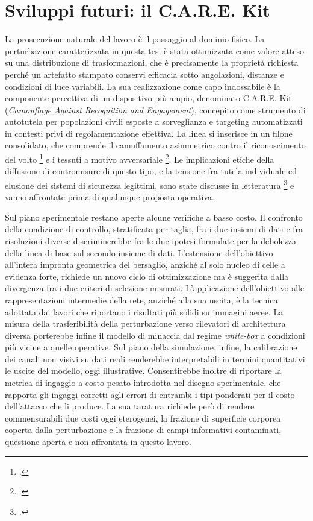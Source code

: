 \ifstampa\documentclass[a4paper,12pt,twoside,openright]{report}\else\documentclass[a4paper,12pt]{report}\fi
\newif\ifrevisione \revisionefalse
\DeclareRobustCommand{\rev}[1]{\ifrevisione{\color{blue!65!black}#1}\else#1\fi}
\begin{document}
\section{Sviluppi futuri: il C.A.R.E. Kit}

La prosecuzione naturale del lavoro è il passaggio al dominio fisico. La perturbazione caratterizzata in questa tesi è stata ottimizzata come valore atteso su una distribuzione di trasformazioni, che è precisamente la proprietà richiesta perché un artefatto stampato conservi efficacia sotto angolazioni, distanze e condizioni di luce variabili. La sua realizzazione come capo indossabile è la componente percettiva di un dispositivo più ampio, denominato C.A.R.E. Kit (\textit{Camouflage Against Recognition and Engagement}), concepito come strumento di autotutela per popolazioni civili esposte a sorveglianza e targeting automatizzati in contesti privi di regolamentazione effettiva. La linea si inserisce in un filone consolidato, che comprende il camuffamento asimmetrico contro il riconoscimento del volto \footcite{harvey_2010} e i tessuti a motivo avversariale \footcite{wu_2020, hu_2022}. Le implicazioni etiche della diffusione di contromisure di questo tipo, e la tensione fra tutela individuale ed elusione dei sistemi di sicurezza legittimi, sono state discusse in letteratura \footcite{helkala_2023} e vanno affrontate prima di qualunque proposta operativa.

Sul piano sperimentale restano aperte alcune verifiche a basso costo. \rev{Il confronto della condizione di controllo, stratificata per taglia, fra i due insiemi di dati e fra risoluzioni diverse} discriminerebbe fra le due ipotesi formulate per la debolezza della linea di base sul secondo insieme di dati. L'estensione dell'obiettivo all'intera impronta geometrica del bersaglio, anziché al solo nucleo di celle a evidenza forte, richiede un nuovo ciclo di ottimizzazione ma è suggerita dalla divergenza fra i due criteri di selezione misurati. L'applicazione dell'obiettivo alle rappresentazioni intermedie della rete, anziché alla sua uscita, è la tecnica adottata dai lavori che riportano i risultati più solidi su immagini aeree. \rev{La misura della trasferibilità della perturbazione verso rilevatori di architettura diversa porterebbe infine il modello di minaccia dal regime \textit{white-box} a condizioni più vicine a quelle operative.} \rev{Sul piano della simulazione, infine, la calibrazione dei canali non visivi su dati reali renderebbe interpretabili in termini quantitativi le uscite del modello, oggi illustrative. Consentirebbe inoltre di}
riportare la metrica di ingaggio a costo pesato introdotta nel disegno
sperimentale, che rapporta gli ingaggi corretti agli errori di entrambi i tipi
ponderati per il costo dell'attacco che li produce. La sua taratura richiede
però di rendere commensurabili due costi oggi eterogenei, la frazione di
superficie corporea coperta dalla perturbazione e la frazione di campi
informativi contaminati, questione aperta e non affrontata in questo lavoro.


\printbibliography[heading=bibintoc,title={Bibliografia}]
\end{document}
